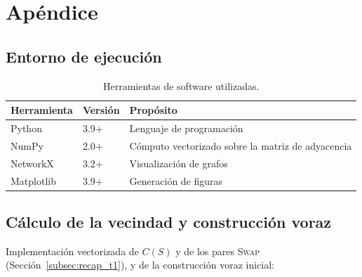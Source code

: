 \section{Apéndice}

\subsection{Entorno de ejecución}

\begin{table}[H]
\centering
\caption{Herramientas de software utilizadas.}
\label{tab:entorno2}
\begin{tabularx}{\textwidth}{@{}l l X@{}}
\hline
\textbf{Herramienta} & \textbf{Versión} & \textbf{Propósito} \\
\hline
Python \parencite{python3} & 3.9+ & Lenguaje de programación \\
NumPy \parencite{numpy2020} & 2.0+ & Cómputo vectorizado sobre la matriz de adyacencia \\
NetworkX \parencite{networkx2008} & 3.2+ & Visualización de grafos \\
Matplotlib \parencite{matplotlib2007} & 3.9+ & Generación de figuras \\
\hline
\end{tabularx}
\end{table}

\subsection{Cálculo de la vecindad y construcción voraz}

Implementación vectorizada de $C(S)$ y de los pares \textsc{Swap} (Sección~\ref{subsec:recap_t1}), y de la construcción voraz inicial:

